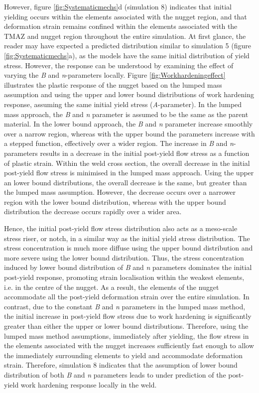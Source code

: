 However, figure \ref{fig:Systematicmechs}d (simulation 8) indicates that initial yielding occurs within the elements associated with the nugget region, and that deformation strain remains confined within the elements associated with the TMAZ and nugget region throughout the entire simulation. At first glance, the reader may have expected a predicted distribution similar to simulation 5 (figure \ref{fig:Systematicmechs}a), as the models have the same initial distribution of yield stress. However, the response can be understood by examining the effect of varying the \textit{B} and \textit{n}-parameters locally. Figure \ref{fig:Workhardeningeffect} illustrates the plastic response of the nugget based on the lumped mass assumption and using the upper and lower bound distributions of work hardening response, assuming the same initial yield stress (\textit{A}-parameter). In the lumped mass approach, the \textit{B} and \textit{n} parameter is assumed to be the same as the parent material. In the lower bound approach, the \textit{B} and \textit{n} parameter increase smoothly over a narrow region, whereas with the upper bound the parameters increase with a stepped function, effectively over a wider region. The increase in \textit{B} and \textit{n}-parameters results in a decrease in the initial post-yield flow stress as a function of plastic strain. Within the weld cross section, the overall decrease in the initial post-yield flow stress is minimised in the lumped mass approach. Using the upper an lower bound distributions, the overall decrease is the same, but greater than the lumped mass assumption. However, the decrease occurs over a narrower region with the lower bound distribution, whereas with the upper bound distribution the decrease occurs rapidly over a wider area. 

Hence, the initial post-yield flow stress distribution also acts as a meso-scale stress riser, or notch, in a similar way as the initial yield stress distribution. The stress concentration is much more diffuse using the upper bound distribution and more severe using the lower bound distribution. Thus, the stress concentration induced by lower bound distribution of \textit{B} and \textit{n} parameters dominates the initial post-yield response, promoting strain localisation within the weakest elements, i.e. in the centre of the nugget. As a result, the elements of the nugget accommodate all the post-yield deformation strain over the entire simulation. In contrast, due to the constant \textit{B} and \textit{n} parameters in the lumped mass method, the initial increase in post-yield flow stress due to work hardening is significantly greater than either the upper or lower bound distributions. Therefore, using the lumped mass method assumptions, immediately after yielding, the flow stress in the elements associated with the nugget increases sufficiently fast enough to allow the immediately surrounding elements to yield and accommodate deformation strain. Therefore, simulation 8 indicates that the assumption of lower bound distribution of both \textit{B} and \textit{n} parameters leads to under prediction of the post-yield work hardening response locally in the weld. 

